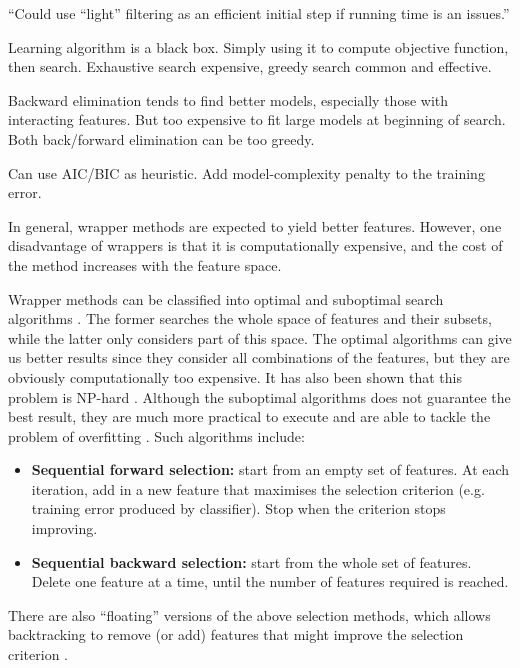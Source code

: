 \documentclass[12pt, twoside, a4paper]{report}
\begin{document}
``Could use ``light'' filtering as an efficient initial step if running time is an issues.''	


Learning algorithm is a black box. Simply using it to compute objective function, then search. Exhaustive search expensive, greedy search common and effective.

Backward elimination tends to find better models, especially those with interacting features. But too expensive to fit large models at beginning of search. Both back/forward elimination can be too greedy.

Can use AIC/BIC as heuristic. Add model-complexity penalty to the training error.


In general, wrapper methods are expected to yield better features. However, one disadvantage of wrappers is that it is computationally expensive, and the cost of the method increases with the feature space.

Wrapper methods can be classified into optimal and suboptimal search algorithms \cite{RefWorks:120}. The former searches the whole space of features and their subsets, while the latter only considers part of this space. The optimal algorithms can give us better results since they consider all combinations of the features, but they are obviously computationally too expensive. It has also been shown that this problem is NP-hard \cite{RefWorks:139}. Although the suboptimal algorithms does not guarantee the best result, they are much more practical to execute and are able to tackle the problem of overfitting \cite{RefWorks:140}. Such algorithms include:
\begin{itemize}
\item \textbf{Sequential forward selection:} start from an empty set of features. At each iteration, add in a new feature that maximises the selection criterion (e.g. training error produced by classifier). Stop when the criterion stops improving.
\item \textbf{Sequential backward selection:} start from the whole set of features. Delete one feature at a time, until the number of features required is reached.
\end{itemize}

There are also ``floating'' versions of the above selection methods, which allows backtracking to remove (or add) features that might improve the selection criterion \cite{RefWorks:121}.
\end{document}
